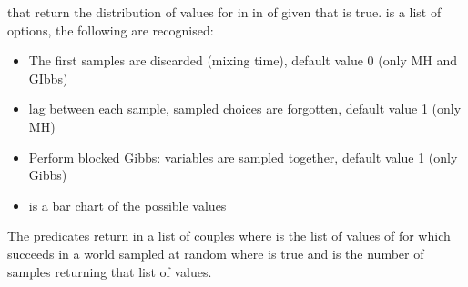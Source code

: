 \documentclass[letterpaper,10pt,english]{sphinxmanual}
\begin{document}
\sphinxAtStartPar
that return the distribution of values for  in  in  of  given that  is true.  is a list of options, the following are recognised:
\begin{itemize}
\item {} 
\sphinxAtStartPar
{} The first  samples are discarded (mixing time), default value 0 (only MH and GIbbs)

\item {} 
\sphinxAtStartPar
{} lag between each sample,  sampled choices are forgotten, default value 1 (only MH)

\item {} 
\sphinxAtStartPar
{} Perform blocked Gibbs:  variables are sampled together, default value 1 (only Gibbs)

\item {} 
\sphinxAtStartPar
{}  is a bar chart of the possible values

\end{itemize}

\sphinxAtStartPar
The predicates return in  a list of couples  where  is the list of values of  for which  succeeds in a world sampled at random where  is true and  is the number of samples returning that list of values.

\begin{sphinxVerbatim}[commandchars=\\\{\}]
  
\end{sphinxVerbatim}
\end{document}
